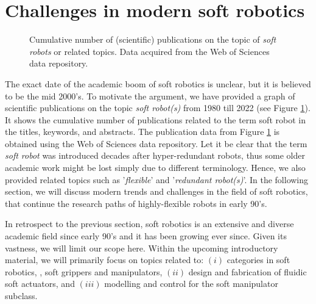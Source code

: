 \vspace{-4mm}
\section{Challenges in modern soft robotics}
\label{sec:C0:1.2}
%
\begin{figure}[!t]
  \vspace{-2mm}
  \ifx\printFigures\undefined
  \else
  \centering
  \vspace{-2mm}
  
  \fi
  \vspace{-1mm}
  \caption{Cumulative number of (scientific) publications on the topic of \emph{soft robots} or related topics. Data acquired from the Web of Sciences data repository.}
  \vspace{-3mm}
  \label{fig:C0:publicationhistory}
\end{figure}
%
The exact date of the academic boom of soft robotics is unclear, but it is believed to be the mid 2000's. To motivate the argument, we have provided a graph of scientific publications on the topic \textit{soft robot(s)} from 1980 till 2022 (see Figure \ref{fig:C0:publicationhistory}). It shows the cumulative number of publications related to the term soft robot in the titles, keywords, and abstracts. The publication data from Figure \ref{fig:C0:publicationhistory} is obtained using the Web of Sciences data repository. Let it be clear that the term \textit{soft robot} was introduced decades after hyper-redundant robots, thus some older academic work might be lost simply due to different terminology. Hence, we also provided related topics such as '\textit{flexible}' and '\textit{redundant robot(s)}'. In the following section, we will discuss modern trends and challenges in the field of soft robotics, that continue the research paths of highly-flexible robots in early 90's.

\begin{rmk}In retrospect to the previous section, soft robotics is an extensive and diverse academic field since early 90's and it has been growing ever since. Given its vastness, we will limit our scope here. Within the upcoming introductory material, we will primarily focus on topics related to: $(i)$ categories in soft robotics, \eg, soft grippers and manipulators, $(ii)$ design and fabrication of fluidic soft actuators, and $(iii)$ modelling and control for the soft manipulator subclass.
\end{rmk}

